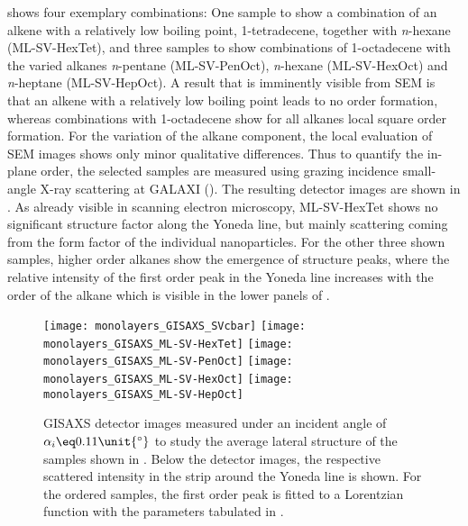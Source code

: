 \documentclass[\main/dresen_thesis.tex]{subfiles}
\begin{document}
     shows four exemplary combinations: One sample to show a combination of an alkene with a relatively low boiling point, 1-tetradecene, together with \textit{n}-hexane (ML-SV-HexTet), and three samples to show combinations of 1-octadecene with the varied alkanes \textit{n}-pentane (ML-SV-PenOct), \textit{n}-hexane (ML-SV-HexOct) and \textit{n}-heptane (ML-SV-HepOct).
    A result that is imminently visible from SEM is that an alkene with a relatively low boiling point leads to no order formation, whereas  combinations with 1-octadecene show for all alkanes local square order formation.
    For the variation of the alkane component, the local evaluation of SEM images shows only minor qualitative differences.
    Thus to quantify the in-plane order, the selected samples are measured using grazing incidence small-angle X-ray scattering at GALAXI ().
    The resulting detector images are shown in .
    As already visible in scanning electron microscopy, ML-SV-HexTet shows no significant structure factor along the Yoneda line, but mainly scattering coming from the form factor of the individual nanoparticles.
    For the other three shown samples, higher order alkanes show the emergence of structure peaks, where the relative intensity of the first order peak in the Yoneda line increases with the order of the alkane which is visible in the lower panels of .

    \begin{figure}[tb]
      \centering
      \texttt{[image: monolayers\_GISAXS\_SVcbar]}
      \texttt{[image: monolayers\_GISAXS\_ML-SV-HexTet]}
      \texttt{[image: monolayers\_GISAXS\_ML-SV-PenOct]}
      \texttt{[image: monolayers\_GISAXS\_ML-SV-HexOct]}
      \texttt{[image: monolayers\_GISAXS\_ML-SV-HepOct]}
      \caption{\label{fig:monolayers:preparation:solventVariation:gisaxs}GISAXS detector images measured under an incident angle of $\alpha_i \eq 0.11 \unit{^\circ}$ to study the average lateral structure of the samples shown in . Below the detector images, the respective scattered intensity in the strip around the Yoneda line is shown. For the ordered samples, the first order peak is fitted to a Lorentzian function with the parameters tabulated in .}
    \end{figure}
\end{document}
